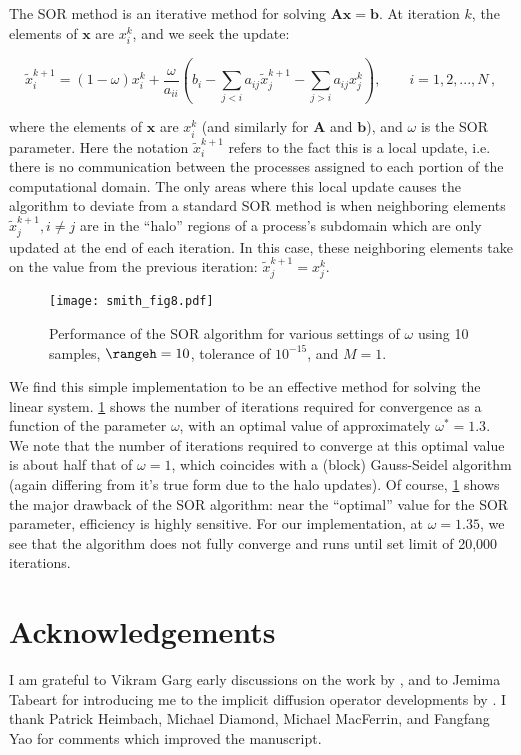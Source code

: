 \documentclass[alpha-refs]{wiley-article}
\begin{document}
The SOR method is an iterative method for solving $\mathbf{A}\mathbf{x} = \mathbf{b}$.
At iteration $k$, the elements of $\mathbf{x}$ are $x_i^k$, and we seek the update:
\begin{linenomath*}\begin{equation}
    \tilde{x}_i^{k+1} = (1-\omega) x_i^k + \dfrac{\omega}{a_{ii}}
    \left( b_i - \sum_{j<i}a_{ij}\tilde{x}_j^{k+1} -
        \sum_{j>i}a_{ij}x_j^{k}\right), \qquad
        i=1,2,...,N \, ,
    \label{eq:sor_update}
\end{equation}\end{linenomath*}
where the elements of $\mathbf{x}$ are $x_i^k$ (and similarly for $\mathbf{A}$
and $\mathbf{b}$), and $\omega$ is the SOR parameter.
Here the notation $\tilde{x}_i^{k+1}$ refers to the fact this is a local update,
i.e. there is no communication between the processes assigned to each portion of
the computational domain.
The only areas where this local update causes the algorithm to deviate from a
standard SOR method is when neighboring elements
$\tilde{x}^{k+1}_{j}, i\ne j$ are in the ``halo'' regions of a process's
subdomain which are only updated at the end of each iteration.
In this case, these neighboring elements take on the value from the previous
iteration: $\tilde{x}^{k+1}_j = x^k_j$.

\begin{figure}
    \centering
    \texttt{[image: smith\_fig8.pdf]}
    \caption{Performance of the SOR algorithm for various settings of $\omega$
        using 10 samples, $\rangeh=10$, tolerance of $10^{-15}$, and $M=1$.
    }
    \label{fig:sor}
\end{figure}

We find this simple implementation to be an effective method for solving the
linear system.
\cref{fig:sor} shows the number of iterations required for
convergence as a function of the parameter $\omega$, with an optimal value of
approximately $\omega^*=1.3$.
We note that the number of iterations required to converge at this optimal value
is about half that of $\omega=1$, which coincides with a (block) Gauss-Seidel algorithm
(again differing from it's true form due to the halo updates).
Of course, \cref{fig:sor} shows the major drawback of the SOR algorithm: near
the ``optimal'' value for the SOR parameter, efficiency is highly sensitive.
For our implementation, at $\omega=1.35$, we see that the algorithm does not
fully converge and runs until set limit of 20,000 iterations.

\section*{Acknowledgements}

I am grateful to Vikram Garg early discussions on the
work by \citet{RSSB:RSSB777}, and to Jemima Tabeart for introducing me to the
implicit diffusion operator developments by \citet{mirouze_representation_2010}.
I thank Patrick Heimbach, Michael Diamond, Michael MacFerrin, and Fangfang Yao
for comments which improved the manuscript.


\end{document}
